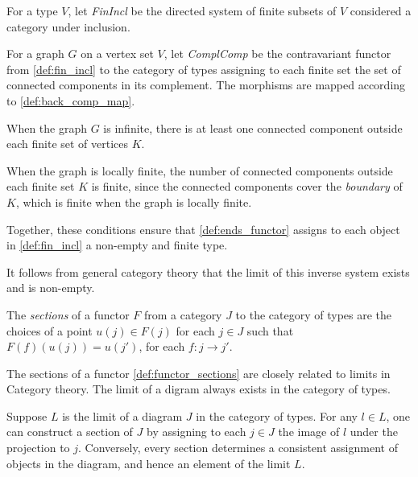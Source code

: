 \begin{definition}
  \label{def:fin_incl}
  \leanok
  For a type $V$, let \emph{FinIncl} be the directed system of finite subsets of $V$ considered a category under inclusion.
\end{definition}

\begin{definition}
  \label{def:ends_functor}
  \leanok

  For a graph $G$ on a vertex set $V$, let \emph{ComplComp} be the contravariant functor from \ref{def:fin_incl} to the category of types assigning to each finite set the set of connected components in its complement. The morphisms are mapped according to \ref{def:back_comp_map}.
\end{definition}

\begin{remark}
  \label{def:finite_nonempty_conditions}
  When the graph $G$ is infinite, there is at least one connected component outside each finite set of vertices $K$.

  When the graph is locally finite, the number of connected components outside each finite set $K$ is finite, since the connected components cover the \emph{boundary} of $K$, which is finite when the graph is locally finite.

  Together, these conditions ensure that \ref{def:ends_functor} assigns to each object in \ref{def:fin_incl} a non-empty and finite type.

  It follows from general category theory that the limit of this inverse system exists and is non-empty.
\end{remark}

\begin{definition}
  \label{def:functor_sections}
  The \emph{sections} of a functor $F$ from a category $J$ to the category of types are the choices of a point $u(j) \in F(j)$ for each $j \in J$ such that $F(f)(u(j)) = u(j')$, for each $f : j \to j'$.
\end{definition}

\begin{remark}
  The sections of a functor \ref{def:functor_sections} are closely related to limits in Category theory. The limit of a digram always exists in the category of types.

  Suppose $L$ is the limit of a diagram $J$ in the category of types. For any $l \in L$, one can construct a section of $J$ by assigning to each $j \in J$ the image of $l$ under the projection to $j$. Conversely, every section determines a consistent assignment of objects in the diagram, and hence an element of the limit $L$.
\end{remark}

